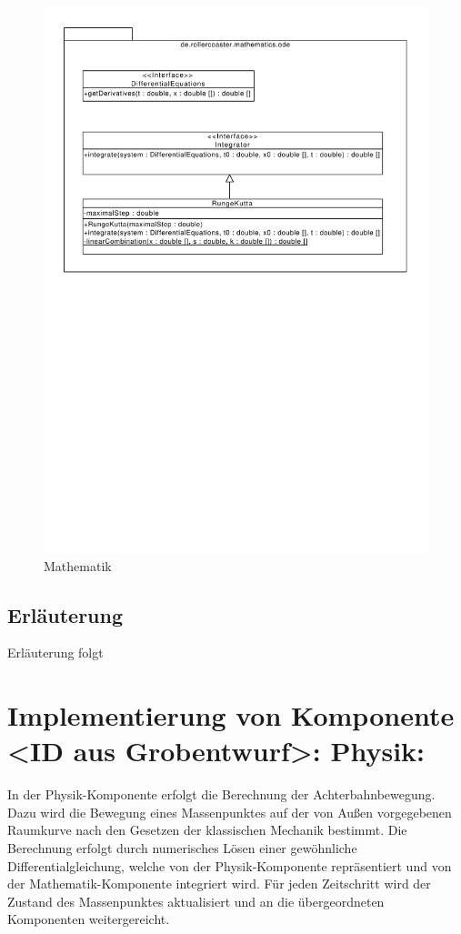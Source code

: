 \begin{figure}
\includegraphics[width=\linewidth]{bilder/Mathematics_ODE}
\caption{Mathematik}
\end{figure}

\subsection{Erläuterung}

Erläuterung folgt

\section{Implementierung von Komponente
         <ID aus Grobentwurf>: Physik:}

In der Physik-Komponente erfolgt die Berechnung der Achterbahnbewegung. Dazu wird
die Bewegung eines Massenpunktes auf der von Außen vorgegebenen Raumkurve
nach den Gesetzen der klassischen Mechanik bestimmt. Die Berechnung erfolgt
durch numerisches Lösen einer gewöhnliche Differentialgleichung, welche von der
Physik-Komponente repräsentiert und von der Mathematik-Komponente integriert wird.
Für jeden Zeitschritt wird der Zustand des Massenpunktes aktualisiert und an die
übergeordneten Komponenten weitergereicht.

